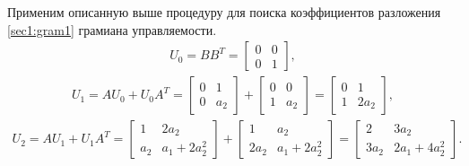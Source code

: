 \documentclass[../main.tex]{subfiles}
\begin{document}
Применим описанную выше процедуру для поиска коэффициентов разложения \eqref{sec1:gram1} грамиана управляемости.
\begin{gather*}
     U_0 = B B^T =  \left[ {\begin{array}{*{20}{c}}
             0&0\\
             0&1
     \end{array}}\right],
\end{gather*}
\begin{gather*}
     U_1 = A U_0 + U_0 A^T = \left[ {\begin{array}{*{20}{c}}
             0&1\\
             0&a_2
     \end{array}}\right] + \left[ {\begin{array}{*{20}{c}}
             0&0\\
             1&a_2
     \end{array}}\right] = \left[ {\begin{array}{*{20}{c}}
             0&1\\
             1&2 a_2
     \end{array}}\right],
\end{gather*}
\begin{gather*}
     U_2 = A U_1 + U_1 A^T = \left[ {\begin{array}{*{20}{c}}
             1&2a_2\\
             a_2&a_1+2a_2^2
     \end{array}}\right] + \left[ {\begin{array}{*{20}{c}}
             1&a_2\\
             2a_2&a_1+2a_2^2
     \end{array}}\right] = \left[ {\begin{array}{*{20}{c}}
             2&3a_2\\
             3a_2&2a_1+4a_2^2
     \end{array}}\right].
\end{gather*}
 
\end{document}
